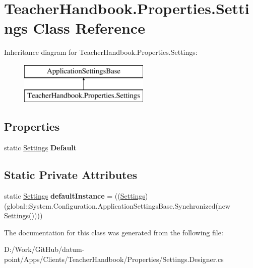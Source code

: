 \hypertarget{class_teacher_handbook_1_1_properties_1_1_settings}{}\section{Teacher\+Handbook.\+Properties.\+Settings Class Reference}
\label{class_teacher_handbook_1_1_properties_1_1_settings}
Inheritance diagram for Teacher\+Handbook.\+Properties.\+Settings\+:\begin{figure}[H]
\begin{center}
\leavevmode
\includegraphics[height=2.000000cm]{d0/d4b/class_teacher_handbook_1_1_properties_1_1_settings}
\end{center}
\end{figure}
\subsection*{Properties}
\begin{DoxyCompactItemize}
\item 
\mbox{\label{class_teacher_handbook_1_1_properties_1_1_settings_a7c06e1129e2b621773a8243e3ff15641}} 
static \mbox{\hyperlink{class_teacher_handbook_1_1_properties_1_1_settings}{Settings}} {\bfseries Default}
\end{DoxyCompactItemize}
\subsection*{Static Private Attributes}
\begin{DoxyCompactItemize}
\item 
\mbox{\label{class_teacher_handbook_1_1_properties_1_1_settings_a0ab4c8518be984ba2f07b4553ab289f2}} 
static \mbox{\hyperlink{class_teacher_handbook_1_1_properties_1_1_settings}{Settings}} {\bfseries default\+Instance} = ((\mbox{\hyperlink{class_teacher_handbook_1_1_properties_1_1_settings}{Settings}})(global\+::\+System.\+Configuration.\+Application\+Settings\+Base.\+Synchronized(new \mbox{\hyperlink{class_teacher_handbook_1_1_properties_1_1_settings}{Settings}}())))
\end{DoxyCompactItemize}


The documentation for this class was generated from the following file\+:\begin{DoxyCompactItemize}
\item 
D\+:/\+Work/\+Git\+Hub/datum-\/point/\+Apps/\+Clients/\+Teacher\+Handbook/\+Properties/Settings.\+Designer.\+cs\end{DoxyCompactItemize}
